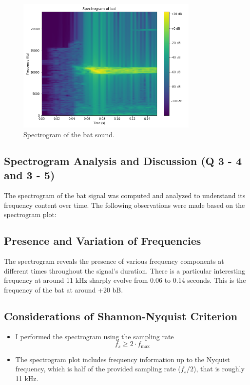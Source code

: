 \documentclass[12pt]{article}
\begin{document}
\begin{figure}[h]
    \centering
    \includegraphics[width=0.8\textwidth]{spectrogram.png}
    \caption{Spectrogram of the bat sound.}
    \label{fig:spectrogram}
\end{figure}

\subsection{Spectrogram Analysis and Discussion (Q 3 - 4 and 3 - 5)}
The spectrogram of the bat signal was computed and analyzed to understand its frequency content over time. The following observations were made based on the spectrogram plot:

\subsection*{Presence and Variation of Frequencies}
The spectrogram reveals the presence of various frequency components at different times throughout the signal's duration. There is a particular interesting frequency at around 11 kHz sharply evolve from 0.06 to 0.14 seconds. This is the frequency of the bat at around +20 bB.

\subsection*{Considerations of Shannon-Nyquist Criterion}

\begin{itemize}
\item I performed the spectrogram using the sampling rate \[f_s \geq 2 \cdot f_{\text{max}}\]

\item The spectrogram plot includes frequency information up to the Nyquist frequency, which is half of the provided sampling rate (\(f_s/2\)), that is roughly 11 kHz.
\end{itemize}
\end{document}
